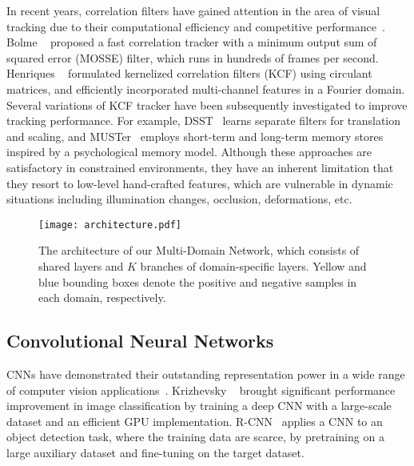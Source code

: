 \documentclass[10pt,twocolumn,letterpaper]{article}
\begin{document}
In recent years, correlation filters have gained attention in the area of visual tracking due to their computational efficiency and competitive performance~\cite{BolmeCVPR10,henriques2015high,danelljan2014accurate,hong2015multi}. 
Bolme \etal~\cite{BolmeCVPR10} proposed a fast correlation tracker with a minimum output sum of squared error (MOSSE) filter, which runs in hundreds of frames per second. 
Henriques \etal~\cite{henriques2015high} formulated  kernelized correlation filters (KCF) using circulant matrices, and efficiently incorporated multi-channel features in a Fourier domain. 
Several variations of KCF tracker have been subsequently investigated to improve tracking performance.
For example, DSST~\cite{danelljan2014accurate} learns separate filters for translation and scaling, and MUSTer~\cite{hong2015multi} employs short-term and long-term memory stores inspired by a psychological memory model. 
Although these approaches are satisfactory in constrained environments, they have an inherent limitation that they resort to low-level hand-crafted features, which are vulnerable in dynamic situations including illumination changes, occlusion, deformations, etc.  

%
\begin{figure*}
\begin{center}
\texttt{[image: architecture.pdf]}
\end{center}
\vspace{-6mm}
   \caption{The architecture of our Multi-Domain Network, which consists of shared layers and $K$ branches of domain-specific layers. Yellow and blue bounding boxes denote the positive and negative samples in each domain, respectively.}
\label{fig:arch}
\end{figure*}
%

\subsection{Convolutional Neural Networks}
CNNs have demonstrated their outstanding representation power in a wide range of computer vision applications~\cite{krizhevsky2012imagenet,chatfield2014return,SimonyanICLR15,girshick2014rich,long2014fully,toshev2014deeppose,taigman2014deepface}.  
Krizhevsky \etal~\cite{krizhevsky2012imagenet} brought significant performance improvement in image classification by training a deep CNN with a large-scale dataset and an efficient GPU implementation. 
R-CNN~\cite{girshick2014rich} applies a CNN to an object detection task, where the training data are scarce, by pretraining on a large auxiliary dataset and fine-tuning on the target dataset. 
\end{document}
